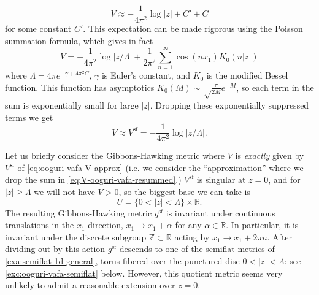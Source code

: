 \documentclass[12pt,letterpaper,reqno]{article}
\numberwithin{equation}{section}
\newcommand{\R}{\ensuremath{\mathbb R}}
\newcommand{\Z}{\ensuremath{\mathbb Z}}
\renewcommand{\sf}{\mathrm{sf}}
\newcommand{\abs}[1]{\lvert#1\rvert}
\newcommand{\ti}[1]{\textit{#1}}
\begin{document}
\begin{example}
\begin{equation}
  V \approx -\frac{1}{4\pi^2} \log \abs{z} + C' + C
\end{equation}
for some constant $C'$.
This expectation can be made rigorous using the Poisson summation formula, which gives in fact
\begin{equation} \label{eq:V-ooguri-vafa-resummed}
  V = -\frac{1}{4\pi^2} \log \abs{z/\Lambda} + \frac{1}{2\pi^2} \sum_{n=1}^\infty \cos (n x_1) K_0(n \abs{z})
\end{equation}
where $\Lambda = 4 \pi e^{-\gamma+4 \pi^2 C}$, $\gamma$ is Euler's constant,
and $K_0$ is the modified Bessel function. This function has asymptotics
$K_0(M) \sim \sqrt\frac{\pi}{2M} e^{-M}$, so each term in the
sum is exponentially small for large $\abs{z}$.
Dropping these exponentially suppressed terms we get
\begin{equation}  \label{eq:ooguri-vafa-V-approx}
  V \approx V^\sf = -\frac{1}{4\pi^2} \log \abs{z/\Lambda}.
\end{equation}

Let us briefly consider the Gibbons-Hawking metric
where $V$ is \ti{exactly} given by
$V^\sf$ of \eqref{eq:ooguri-vafa-V-approx} (i.e. we consider the
``approximation'' where we drop the sum in \eqref{eq:V-ooguri-vafa-resummed}.)
$V^\sf$ is singular at $z=0$, and
for $\abs{z} \ge \Lambda$
we will not have $V > 0$, so the biggest base we can take is
\begin{equation}
U = \{0 < \abs{z} < \Lambda \} \times \R.
\end{equation}
The resulting Gibbons-Hawking metric $g^\sf$ is
invariant under continuous translations
in the $x_1$ direction, $x_1 \to x_1 + \alpha$ for any $\alpha \in \R$.
In particular, it is invariant under the discrete subgroup
$\Z \subset \R$
acting by $x_1 \to x_1 + 2 \pi n$.
After dividing out by this action $g^\sf$ descends to
one of the semiflat metrics of \autoref{exa:semiflat-1d-general}, torus
fibered over the punctured disc $0 < \abs{z} < \Lambda$:
see \autoref{exc:ooguri-vafa-semiflat} below.
However, this quotient metric seems very unlikely to admit a reasonable
extension over $z = 0$.


\end{example}
\end{document}
